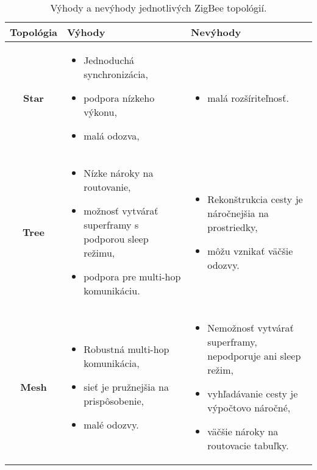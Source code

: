 \documentclass[12pt,a4paper,oneside,openright]{report}
\begin{document}
\singlespacing
\begin{table}
	\caption{Výhody a nevýhody jednotlivých ZigBee topológií. \cite{zigbeebook}} 
	\label{table:zigbee_arch}
	\begin{tabularx}{\textwidth}{|c|Y|Y|}
		\hline
		\textbf{Topológia} & \textbf{Výhody} & \textbf{Nevýhody} \\
		\hline
		\textbf{Star} & 
		\singlespacing
		\begin{itemize}
			\item Jednoduchá synchronizácia,
			\item podpora nízkeho výkonu,
			\item malá odozva,
		\end{itemize}
		&  
		\begin{itemize}
			\item malá rozšíriteľnosť.
		\end{itemize}
		\\
		\hline
		\textbf{Tree} & 
		\begin{itemize}
			\item Nízke nároky na routovanie,
			\item možnosť vytvárať superframy s podporou sleep režimu,
			\item podpora pre multi-hop komunikáciu.
		\end{itemize}
		&
		\begin{itemize}
			\item Rekonštrukcia cesty je náročnejšia na prostriedky,
			\item môžu vznikať väčšie odozvy.
		\end{itemize}
		\\
		\hline
		\textbf{Mesh} &
		\begin{itemize}
			\item Robustná multi-hop komunikácia,
			\item sieť je pružnejšia na prispôsobenie,
			\item malé odozvy.
		\end{itemize} & 
		\begin{itemize}
			\item Nemožnosť vytvárať superframy, nepodporuje ani sleep režim,
			\item vyhľadávanie cesty je výpočtovo náročné,
			\item väčšie nároky na routovacie tabuľky.
		\end{itemize} \\
		\hline
	\end{tabularx}
\end{table}
\onehalfspacing
\end{document}
